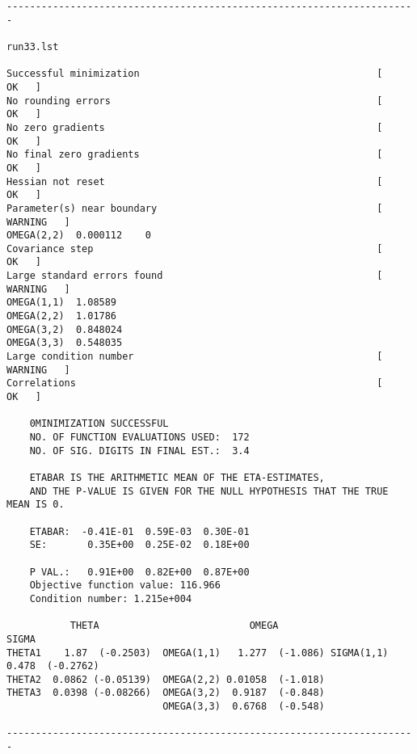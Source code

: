 \begin{verbatim}
-----------------------------------------------------------------------

run33.lst

Successful minimization                                         [    OK   ]   
No rounding errors                                              [    OK   ]   
No zero gradients                                               [    OK   ]   
No final zero gradients                                         [    OK   ]   
Hessian not reset                                               [    OK   ]   
Parameter(s) near boundary                                      [    WARNING   ]   
OMEGA(2,2)	0.000112	0
Covariance step                                                 [    OK   ]   
Large standard errors found                                     [    WARNING   ]   
OMEGA(1,1)	1.08589
OMEGA(2,2)	1.01786
OMEGA(3,2)	0.848024
OMEGA(3,3)	0.548035
Large condition number                                          [    WARNING   ]   
Correlations                                                    [    OK   ]

    0MINIMIZATION SUCCESSFUL
    NO. OF FUNCTION EVALUATIONS USED:  172
    NO. OF SIG. DIGITS IN FINAL EST.:  3.4

    ETABAR IS THE ARITHMETIC MEAN OF THE ETA-ESTIMATES,
    AND THE P-VALUE IS GIVEN FOR THE NULL HYPOTHESIS THAT THE TRUE MEAN IS 0.

    ETABAR:  -0.41E-01  0.59E-03  0.30E-01
    SE:       0.35E+00  0.25E-02  0.18E+00

    P VAL.:   0.91E+00  0.82E+00  0.87E+00
    Objective function value: 116.966
    Condition number: 1.215e+004

           THETA                          OMEGA                      SIGMA            
THETA1    1.87  (-0.2503)  OMEGA(1,1)   1.277  (-1.086) SIGMA(1,1) 0.478  (-0.2762) 
THETA2  0.0862 (-0.05139)  OMEGA(2,2) 0.01058  (-1.018)                                
THETA3  0.0398 (-0.08266)  OMEGA(3,2)  0.9187  (-0.848)
                           OMEGA(3,3)  0.6768  (-0.548)

-----------------------------------------------------------------------
\end{verbatim}

